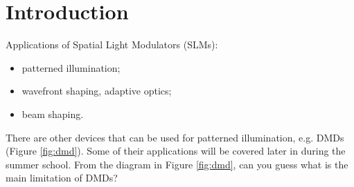 \documentclass[a4paper]{report}
\begin{document}


\addtocounter{exercises}{1}

	

\section{Introduction}
Applications of Spatial Light Modulators (SLMs):
\begin{itemize}
	\item patterned illumination;
	\item wavefront shaping, adaptive optics;
	\item beam shaping.
\end{itemize}

There are other devices that can be used for patterned illumination, e.g. DMDs (Figure \ref{fig:dmd}). Some of their applications will be covered later in during the summer school. From the diagram in Figure \ref{fig:dmd}, can you guess what is the main limitation of DMDs?
\end{document}
